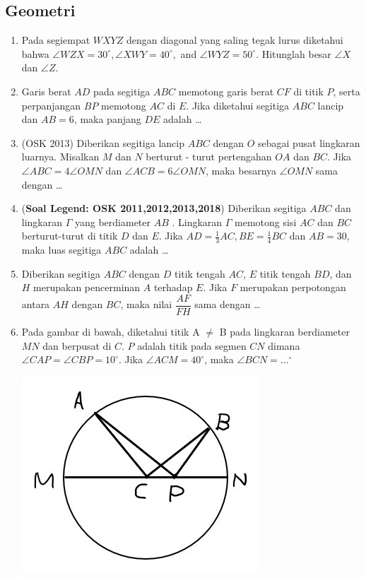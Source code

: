 \subsection{Geometri}
\begin{enumerate}
    \item Pada segiempat $WXYZ$ dengan diagonal yang saling tegak lurus diketahui bahwa $\angle WZX = 30^\circ, \angle XWY = 40^\circ,$ and $\angle WYZ = 50^\circ$. Hitunglah besar $\angle X$ dan $\angle Z$.
    
    \item
		Garis berat $AD$ pada segitiga $ABC$ memotong garis berat $CF$ di titik $P$, serta perpanjangan $BP$ memotong $AC$ di $E$. Jika diketahui segitiga $ABC$ lancip dan $AB=6$, maka panjang $DE$ adalah \dots
		
	\item (OSK 2013) Diberikan segitiga lancip $ABC$ dengan $O$ sebagai pusat lingkaran luarnya. Misalkan $M$ dan $N$
berturut - turut pertengahan $OA$ dan $BC$. Jika $\angle ABC = 4\angle OMN$ dan $\angle ACB = 6\angle OMN$,
maka besarnya $\angle OMN$ sama dengan \dots

    \item (\textbf{Soal Legend: OSK 2011,2012,2013,2018}) Diberikan segitiga $ABC$ dan lingkaran $\Gamma$ yang berdiameter $AB$ . Lingkaran $\Gamma$ memotong sisi $AC$ dan $BC$
berturut-turut di titik $D$ dan $E$. Jika $AD = \frac13 AC, BE =\frac14 BC$ dan $AB = 30$, maka luas segitiga $ABC$ adalah \dots
		
	\item
		Diberikan segitiga $ABC$ dengan $D$ titik tengah $AC$, $E$ titik tengah $BD$, dan $H$ merupakan pencerminan $A$ terhadap $E$. Jika $F$ merupakan perpotongan antara $AH$ dengan $BC$, maka nilai $\dfrac{AF}{FH}$ sama dengan \dots
		
	\item 	
		 Pada gambar di bawah, diketahui titik A $\ne$ B pada lingkaran berdiameter $MN$ dan berpusat di $C$. $P$ adalah titik pada segmen $CN$ dimana $\angle CAP = \angle CBP = 10 ^\circ$. Jika $\angle ACM = 40^\circ$, maka $\angle BCN = \dots^\circ$
		 
		 \includegraphics[scale=0.7]{pemanasan post test geom}
		 

\end{enumerate}
